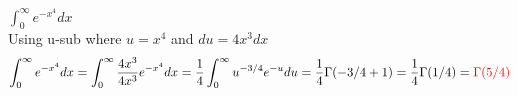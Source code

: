 \item [9.] $\int_0^\infty e^{-x^4}dx$
\\[2mm]Using u-sub where $u = x^4$ and $du = 4x^3dx$
\[
    \int_0^\infty e^{-x^4}dx=\int_0^\infty \frac{4x^3}{4x^3}e^{-x^4}dx=\frac{1}{4}\int_0^\infty u^{-3/4}e^{-u}du=\frac{1}{4}\Gamma(-3/4+1)=\frac{1}{4}\Gamma(1/4)=\textcolor{red}{\Gamma(5/4)}
\]